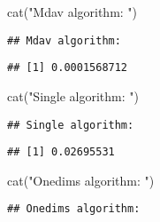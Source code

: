 \documentclass[
]{article}
\newenvironment{Shaded}{\begin{snugshade}}{\end{snugshade}}
\newcommand{\FunctionTok}[1]{\textcolor[rgb]{0.00,0.00,0.00}{#1}}
\newcommand{\NormalTok}[1]{#1}
\newcommand{\SpecialCharTok}[1]{\textcolor[rgb]{0.00,0.00,0.00}{#1}}
\newcommand{\StringTok}[1]{\textcolor[rgb]{0.31,0.60,0.02}{#1}}
\begin{document}
\begin{Shaded}
\begin{Highlighting}[]
\FunctionTok{cat}\NormalTok{(}\StringTok{"Mdav algorithm: "}\NormalTok{)}
\end{Highlighting}
\end{Shaded}

\begin{verbatim}
## Mdav algorithm:
\end{verbatim}

\begin{Shaded}
\end{Shaded}

\begin{verbatim}
## [1] 0.0001568712
\end{verbatim}

\begin{Shaded}
\begin{Highlighting}[]
\FunctionTok{cat}\NormalTok{(}\StringTok{"Single algorithm: "}\NormalTok{)}
\end{Highlighting}
\end{Shaded}

\begin{verbatim}
## Single algorithm:
\end{verbatim}

\begin{Shaded}
\end{Shaded}

\begin{verbatim}
## [1] 0.02695531
\end{verbatim}

\begin{Shaded}
\begin{Highlighting}[]
\FunctionTok{cat}\NormalTok{(}\StringTok{"Onedims algorithm: "}\NormalTok{)}
\end{Highlighting}
\end{Shaded}

\begin{verbatim}
## Onedims algorithm:
\end{verbatim}
\end{document}
